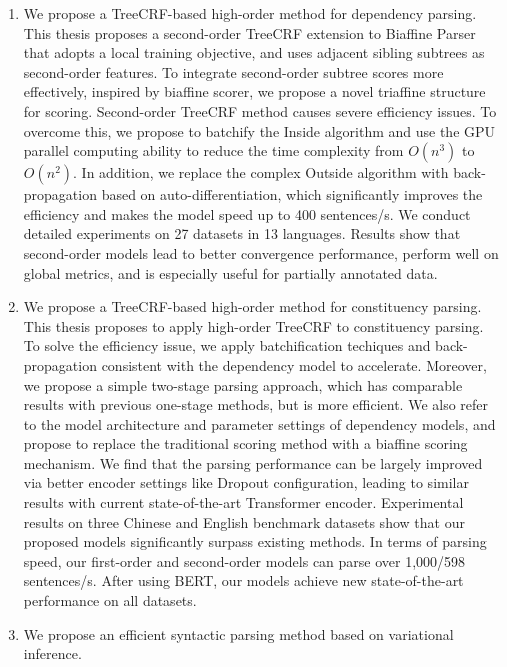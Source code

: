 \begin{eabstract}
  \begin{enumerate}
    \item We propose a TreeCRF-based high-order method for dependency parsing.
          This thesis proposes a second-order TreeCRF extension to Biaffine Parser that adopts a local training objective, and uses adjacent sibling subtrees as second-order features.
          To integrate second-order subtree scores more effectively, inspired by biaffine scorer, we propose a novel triaffine structure for scoring.
          Second-order TreeCRF method causes severe efficiency issues.
          To overcome this, we propose to batchify the Inside algorithm and use the GPU parallel computing ability to reduce the time complexity from $O(n^3)$ to $O(n^2)$.
          In addition, we replace the complex Outside algorithm with back-propagation based on auto-differentiation, which significantly improves the efficiency and makes the model speed up to 400 sentences/s.
          We conduct detailed experiments on 27 datasets in 13 languages.
          Results show that second-order models lead to better convergence performance, perform well on global metrics, and is especially useful for partially annotated data.
    \item We propose a TreeCRF-based high-order method for constituency parsing.
          This thesis proposes to apply high-order TreeCRF to constituency parsing.
          To solve the efficiency issue, we apply batchification techiques and back-propagation consistent with the dependency model to accelerate.
          Moreover, we propose a simple two-stage parsing approach, which has comparable results with previous one-stage methods, but is more efficient.
          We also refer to the model architecture and parameter settings of dependency models, and propose to replace the traditional scoring method with a biaffine scoring mechanism.
          We find that the parsing performance can be largely improved via better encoder settings like Dropout configuration, leading to similar results with current state-of-the-art Transformer encoder.
          Experimental results on three Chinese and English benchmark datasets show that our proposed models significantly surpass existing methods.
          In terms of parsing speed, our first-order and second-order models can parse over 1,000/598 sentences/s.
          After using BERT, our models achieve new state-of-the-art performance on all datasets.
    \item We propose an efficient syntactic parsing method based on variational inference.

\end{enumerate}
\end{eabstract}
